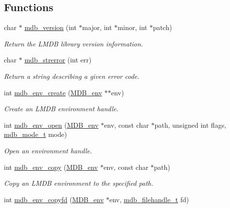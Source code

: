 \subsection*{Functions}
\begin{DoxyCompactItemize}
\item 
char $\ast$ \mbox{\hyperlink{group__mdb_ga0e5d7298fc39b3c187fffbe30264c968}{mdb\+\_\+version}} (int $\ast$major, int $\ast$minor, int $\ast$patch)
\begin{DoxyCompactList}\small\item\em Return the L\+M\+DB library version information. \end{DoxyCompactList}\item 
char $\ast$ \mbox{\hyperlink{group__mdb_ga569e66c1e3edc1a6016b86719ee3d098}{mdb\+\_\+strerror}} (int err)
\begin{DoxyCompactList}\small\item\em Return a string describing a given error code. \end{DoxyCompactList}\item 
int \mbox{\hyperlink{group__mdb_gaad6be3d8dcd4ea01f8df436f41d158d4}{mdb\+\_\+env\+\_\+create}} (\mbox{\hyperlink{struct_m_d_b__env}{M\+D\+B\+\_\+env}} $\ast$$\ast$env)
\begin{DoxyCompactList}\small\item\em Create an L\+M\+DB environment handle. \end{DoxyCompactList}\item 
int \mbox{\hyperlink{group__mdb_ga32a193c6bf4d7d5c5d579e71f22e9340}{mdb\+\_\+env\+\_\+open}} (\mbox{\hyperlink{struct_m_d_b__env}{M\+D\+B\+\_\+env}} $\ast$env, const char $\ast$path, unsigned int flags, \mbox{\hyperlink{lmdb_8h_a6bc5fbe1ea1873df138108acdf04a28d}{mdb\+\_\+mode\+\_\+t}} mode)
\begin{DoxyCompactList}\small\item\em Open an environment handle. \end{DoxyCompactList}\item 
int \mbox{\hyperlink{group__mdb_ga5d51d6130325f7353db0955dbedbc378}{mdb\+\_\+env\+\_\+copy}} (\mbox{\hyperlink{struct_m_d_b__env}{M\+D\+B\+\_\+env}} $\ast$env, const char $\ast$path)
\begin{DoxyCompactList}\small\item\em Copy an L\+M\+DB environment to the specified path. \end{DoxyCompactList}\item 
int \mbox{\hyperlink{group__mdb_ga470b0bcc64ac417de5de5930f20b1a28}{mdb\+\_\+env\+\_\+copyfd}} (\mbox{\hyperlink{struct_m_d_b__env}{M\+D\+B\+\_\+env}} $\ast$env, \mbox{\hyperlink{lmdb_8h_a6799f2853adc2e3b863dc2e6d9d0064f}{mdb\+\_\+filehandle\+\_\+t}} fd)
$$
\end{DoxyCompactItemize}
